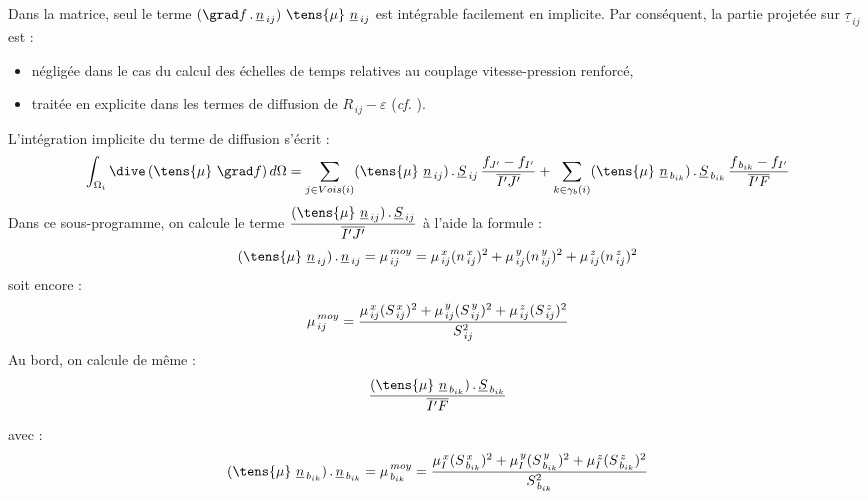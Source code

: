 Dans la matrice, seul le terme
$(\grad f \,.\,\underline{n}_{\,ij})\ \tens{\mu}\ \underline{n}_{\,ij}$ est
int\'egrable facilement en implicite. Par cons\'equent, la partie projet\'ee sur $\underline{\tau}_{\,ij}$
est :
\begin{itemize}
\item n\'eglig\'ee dans le cas du calcul des échelles de temps relatives au
couplage vitesse-pression renforcé,
\item trait\'ee en explicite dans les termes de diffusion de
$R_{\,ij}-\varepsilon$ (\emph{cf.} ).\\
\end{itemize}
L'intégration implicite du terme de diffusion s'\'ecrit :
\begin{equation}
\int_{\Omega_i}\dive\,(\tens{\mu}\ \grad f )\,d\Omega = \sum\limits_{j \in
Vois(i)}(\tens{\mu}\ \underline{n}_{\,ij})\,.\,\underline{S}_{\,ij}\,
\frac{f_{J'}-f_{I'}}{\overline{I'J'}} + \sum\limits_{k \in
\gamma_b(i)}(\tens{\mu}\ \underline{n}_{\,b_{ik}})\,.\,\underline{S}_{\,b_{ik}}
\,\frac{f_{\,b_{ik}}-f_{I'}}{\overline{I'F}}
\end{equation}
Dans ce sous-programme, on calcule le terme
$\displaystyle \frac{(\tens{\mu}\
\underline{n}_{\,ij})\,.\,\underline{S}_{\,ij}}{\overline{I'J'}}$ \`a l'aide la
formule :
\begin{equation}\notag
(\tens{\mu}\ \underline{n}_{\,ij})\,.\,\underline{n}_{\,ij} =
\mu_{\,ij}^{\,moy}=\mu_{\,ij}^{\,x} ( n_{\,ij}^{\,x})^2 + \mu_{\,ij}^{\,y} (n_{\,ij}^{\,y})^2 + \mu_{\,ij}^{\,z}(n_{\,ij}^{\,z})^2
\end{equation}
soit encore :
\begin{equation}\notag
\mu_{\,ij}^{\,moy}=\frac{\mu_{\,ij}^{\,x}
(S_{\,ij}^{\,x})^2 + \mu_{\,ij}^{\,y} (S_{\,ij}^{\,y})^2 +
\mu_{\,ij}^{\,z} (S_{\,ij}^{\,z})^2}{S_{\,ij}^2}
\end{equation}
Au bord, on calcule de même :
\begin{equation}\notag
\displaystyle \frac{(\tens{\mu}\
\underline{n}_{\,b_{ik}})\,.\,\underline{S}_{\,b_{ik}}}{\overline{I'F}}
\end{equation}

 avec :
\begin{equation}\notag
(\tens{\mu}\ \underline{n}_{\,b_{ik}})\,.\,\underline{n}_{\,b_{ik}} =
\mu_{\,b_{ik}}^{\,moy} = \displaystyle \frac{\mu_{I}^{\,x}
(S_{\,b_{ik}}^{\,x})^2 + \mu_{I}^{\,y} (S_{\,b_{ik}}^{\,y})^2 +
\mu_{I}^{\,z} (S_{\,b_{ik}}^{\,z})^2}{S_{\,b_{ik}}^2}
\end{equation}

